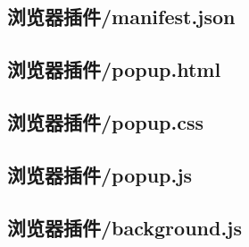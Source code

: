 \documentclass[UTF8,a4paper,11pt,fontset=none]{ctexart}
\begin{document}
\subsection{浏览器插件/manifest.json}

\subsection{浏览器插件/popup.html}

\subsection{浏览器插件/popup.css}

\subsection{浏览器插件/popup.js}

\subsection{浏览器插件/background.js}
\end{document}
